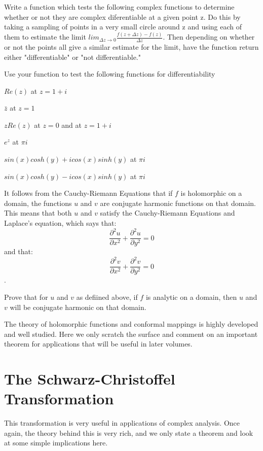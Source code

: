 \begin{problem}
Write a function which tests the following complex functions to determine whether or not they are complex diferentiable at a given point z. Do this by taking a sampling of points in a very small circle around z and using each of them to estimate the limit $lim_{\Delta z \to 0} \frac{f(z+\Delta z)-f(z)}{\Delta z}$. Then depending on whether or not the points all give a similar estimate for the limit, have the function return either "differentiable" or "not differentiable." 

Use your function to test the following functions for differentiability

$Re(z)$ at $z=1+ i$

$\bar{z}$ at $z=1$

$z Re(z)$ at $z=0$ and at $z=1+ i$

$e^z$ at $\pi i$

$sin(x) cosh(y) + i cos(x) sinh(y)$ at $\pi i$

$sin(x) cosh(y) - i cos(x) sinh(y)$ at $\pi i$
\end{problem}

It follows from the Cauchy-Riemann Equations that if $f$ is holomorphic on a domain, the functions $u$ and $v$ are conjugate harmonic functions on that domain. This means that both $u$ and $v$ satisfy the Cauchy-Riemann Equations and Laplace's equation, which says that: $$\frac{\partial^2 u}{\partial x^2}+\frac{\partial^2 u}{\partial y^2}=0$$ and that: $$\frac{\partial^2 v}{\partial x^2}+\frac{\partial^2 v}{\partial y^2}=0$$. 

\begin{problem}
Prove that for $u$ and $v$ as defiined above, if $f$ is analytic on a domain, then $u$ and $v$ will be conjugate harmonic on that domain.
\end{problem}

The theory of holomorphic functions and conformal mappings is highly developed and well studied.  Here we only scratch the surface and comment on an important theorem for applications that will be useful in later volumes.

\section*{The Schwarz-Christoffel Transformation}
This transformation is very useful in applications of complex analysis.  Once again, the theory behind this is very rich, and we only state a theorem and look at some simple implications here.

